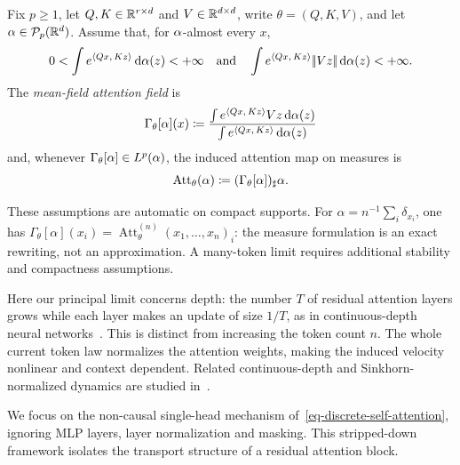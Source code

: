 \begin{defn}\label{def-mean-field-attention-map}
	Fix \(p\geq1\), let $Q,K\in\mathbb{R}^{r\times d}$ and $V\in\mathbb{R}^{d\times d}$, write \(\theta=(Q,K,V)\), and let \(\alpha\in\mathcal{P}_p(\mathbb{R}^d)\). Assume that, for \(\alpha\)-almost every \(x\),
	\[
		0<\int e^{\langle Qx,\,Kz\rangle}\,\mathrm{d}\alpha(z)<+\infty
		\quad \text{and} \quad
		\int e^{\langle Qx,\,Kz\rangle}|\!| Vz |\!|\,\mathrm{d}\alpha(z)<+\infty.
	\]
	The \emph{mean-field attention field} is
	\begin{equation}\label{eq-mean-field-attention}
		\Gamma_\theta[\alpha](x)
		\coloneqq
		\frac{\int e^{\langle Qx,\,Kz\rangle}Vz\,\mathrm{d}\alpha(z)}
		{\int e^{\langle Qx,\,Kz\rangle}\,\mathrm{d}\alpha(z)}
	\end{equation}
	and, whenever \(\Gamma_\theta[\alpha]\in L^p(\alpha)\), the induced attention map on measures is
	\[
		\operatorname{Att}_\theta(\alpha)
		\coloneqq
		(\Gamma_\theta[\alpha])_\sharp\alpha.
	\]
\end{defn}

These assumptions are automatic on compact supports. For $\alpha=n^{-1}\sum_i\delta_{x_i}$, one has $\Gamma_\theta[\alpha](x_i)=\operatorname{Att}^{(n)}_\theta(x_1,\ldots,x_n)_i$: the measure formulation is an exact rewriting, not an approximation. A many-token limit requires additional stability and compactness assumptions.

Here our principal limit concerns depth: the number $T$ of residual attention layers grows while each layer makes an update of size $1/T$, as in continuous-depth neural networks~\citep{Chen2018NeuralODE}. This is distinct from increasing the token count $n$. The whole current token law normalizes the attention weights, making the induced velocity nonlinear and context dependent. Related continuous-depth and Sinkhorn-normalized dynamics are studied in~\citet{Sander2022Sinkformers,Castin2025DynamicsTransformers}.

We focus on the non-causal single-head mechanism of~\eqref{eq-discrete-self-attention}, ignoring MLP layers, layer normalization and masking. This stripped-down framework isolates the transport structure of a residual attention block.

